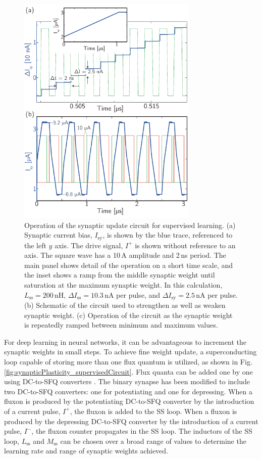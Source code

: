 \documentclass[twocolumn]{article}
\begin{document}
\begin{figure}[t!]
	\centerline{\includegraphics[width=8.6cm]{_synapticPlasticity_supervised_small.pdf}}
	\caption{\label{fig:synapticPlasticity_supervised} Operation of the synaptic update circuit for supervised learning. (a) Synaptic current bias, $I_{\mathrm{sy}}$, is shown by the blue trace, referenced to the left $y$ axis. The drive signal, $I^+$ is shown without reference to an axis. The square wave has a 10\,\textmu A amplitude and 2\,ns period. The main panel shows detail of the operation on a short time scale, and the inset shows a ramp from the middle synaptic weight until saturation at the maximum synaptic weight. In this calculation, $L_{\mathrm{ss}} = 200$\,nH, $\Delta I_{\mathrm{ss}} = 10.3$\,nA per pulse, and $\Delta I_{\mathrm{sy}} = 2.5$\,nA per pulse. (b) Schematic of the circuit used to strengthen as well as weaken synaptic weight. (c) Operation of the circuit as the synaptic weight is repeatedly ramped between minimum and maximum values.}
\end{figure}
For deep learning in neural networks, it can be advantageous to increment the synaptic weights in small steps. To achieve fine weight update, a superconducting loop capable of storing more than one flux quantum is utilized, as shown in Fig.\,\ref{fig:synapticPlasticity_supervisedCircuit}. Flux quanta can be added one by one using DC-to-SFQ converters \cite{ka1999,vatu1998}. The binary synapse has been modified to include two DC-to-SFQ converters: one for potentiating and one for depressing.  When a fluxon is produced by the potentiating DC-to-SFQ converter by the introduction of a current pulse, $I^+$, the fluxon is added to the SS loop. When a fluxon is produced by the depressing DC-to-SFQ converter by the introduction of a current pulse, $I^-$, the fluxon counter propagates in the SS loop. The inductors of the SS loop, $L_{\mathrm{ss}}$ and $M_{\mathrm{ss}}$ can be chosen over a broad range of values to determine the learning rate and range of synaptic weights achieved.
\end{document}
